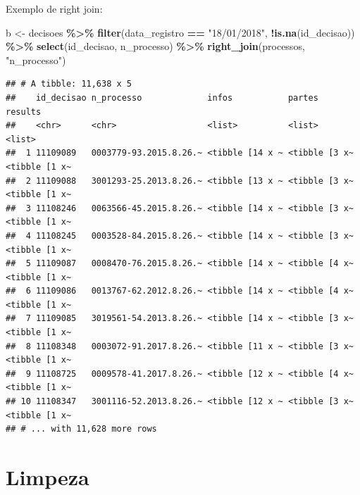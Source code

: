 \documentclass[
  9pt,
  ignorenonframetext,
]{beamer}
\newenvironment{Shaded}{\begin{snugshade}}{\end{snugshade}}
\newcommand{\KeywordTok}[1]{\textcolor[rgb]{0.13,0.29,0.53}{\textbf{#1}}}
\newcommand{\NormalTok}[1]{#1}
\newcommand{\OperatorTok}[1]{\textcolor[rgb]{0.81,0.36,0.00}{\textbf{#1}}}
\newcommand{\StringTok}[1]{\textcolor[rgb]{0.31,0.60,0.02}{#1}}
\begin{document}
\begin{frame}[fragile]{Exemplo de right join:}
\protect\hypertarget{exemplo-de-right-join}{}
\begin{Shaded}
\begin{Highlighting}[]
\NormalTok{b \textless{}{-}}\StringTok{ }\NormalTok{decisoes }\OperatorTok{\%\textgreater{}\%}\StringTok{ }
\StringTok{  }\KeywordTok{filter}\NormalTok{(data\_registro }\OperatorTok{==}\StringTok{ "18/01/2018"}\NormalTok{, }\OperatorTok{!}\KeywordTok{is.na}\NormalTok{(id\_decisao)) }\OperatorTok{\%\textgreater{}\%}\StringTok{ }
\StringTok{  }\KeywordTok{select}\NormalTok{(id\_decisao, n\_processo) }\OperatorTok{\%\textgreater{}\%}\StringTok{ }
\StringTok{  }\KeywordTok{right\_join}\NormalTok{(processos, }\StringTok{"n\_processo"}\NormalTok{)}
\end{Highlighting}
\end{Shaded}
\end{frame}

\begin{frame}[fragile]{}
\protect\hypertarget{section-6}{}
\begin{verbatim}
## # A tibble: 11,638 x 5
##    id_decisao n_processo             infos           partes        results      
##    <chr>      <chr>                  <list>          <list>        <list>       
##  1 11109089   0003779-93.2015.8.26.~ <tibble [14 x ~ <tibble [3 x~ <tibble [1 x~
##  2 11109088   3001293-25.2013.8.26.~ <tibble [13 x ~ <tibble [3 x~ <tibble [1 x~
##  3 11108246   0063566-45.2015.8.26.~ <tibble [14 x ~ <tibble [3 x~ <tibble [1 x~
##  4 11108245   0003528-84.2015.8.26.~ <tibble [14 x ~ <tibble [3 x~ <tibble [1 x~
##  5 11109087   0008470-76.2015.8.26.~ <tibble [14 x ~ <tibble [4 x~ <tibble [1 x~
##  6 11109086   0013767-62.2012.8.26.~ <tibble [14 x ~ <tibble [4 x~ <tibble [1 x~
##  7 11109085   3019561-54.2013.8.26.~ <tibble [14 x ~ <tibble [3 x~ <tibble [1 x~
##  8 11108348   0003072-91.2017.8.26.~ <tibble [11 x ~ <tibble [3 x~ <tibble [1 x~
##  9 11108725   0009578-41.2017.8.26.~ <tibble [12 x ~ <tibble [4 x~ <tibble [1 x~
## 10 11108347   3001116-52.2013.8.26.~ <tibble [12 x ~ <tibble [3 x~ <tibble [1 x~
## # ... with 11,628 more rows
\end{verbatim}
\end{frame}

\hypertarget{limpeza}{%
\section{Limpeza}\label{limpeza}}
\end{document}
